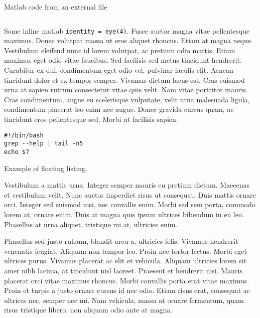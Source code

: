 \documentclass[10pt,twocolumn,letterpaper]{article}
\begin{document}
Matlab code from an external file

\inputminted[bgcolor=bg]{matlab}{code.m}

Some inline matlab \texttt{identity = eye(4)}.  Fusce auctor magna vitae pellentesque maximus. Donec volutpat massa ut eros aliquet rhoncus. Etiam at magna neque. Vestibulum eleifend nunc id lorem volutpat, ac pretium odio mattis. Etiam maximus eget odio vitae faucibus. Sed facilisis sed metus tincidunt hendrerit. Curabitur ex dui, condimentum eget odio vel, pulvinar iaculis elit. Aenean tincidunt dolor et ex tempor semper. Vivamus dictum lacus est. Cras euismod urna at sapien rutrum consectetur vitae quis velit. Nam vitae porttitor mauris. Cras condimentum, augue eu scelerisque vulputate, velit urna malesuada ligula, condimentum placerat leo enim nec augue. Donec gravida cursus quam, ac tincidunt eros pellentesque sed. Morbi ut facilisis sapien.

\begin{listing}[xleftmargin=25.0ex,tp]
 \centering
\begin{minipage}{0.8\linewidth}


\begin{verbatim}
#!/bin/bash
grep --help | tail -n5 
echo $?
\end{verbatim}
\end{minipage}
\caption{Example of floating listing.}
\label{lst:example}
\end{listing}

Vestibulum a mattis urna. Integer semper mauris eu pretium dictum. Maecenas et vestibulum velit. Nunc auctor imperdiet risus ut consequat. Duis mattis ornare orci. Integer sed euismod nisi, nec convallis enim. Morbi sed sem porta, commodo lorem at, ornare enim. Duis at magna quis ipsum ultrices bibendum in eu leo. Phasellus at urna aliquet, tristique mi at, ultricies enim.



Phasellus sed justo rutrum, blandit arcu a, ultricies felis. Vivamus hendrerit venenatis feugiat. Aliquam non tempor leo. Proin nec tortor lectus. Morbi eget ultrices purus. Vivamus placerat ac elit et vehicula. Aliquam ultricies lorem sit amet nibh lacinia, at tincidunt nisl laoreet. Praesent et hendrerit nisi. Mauris placerat orci vitae maximus rhoncus. Morbi convallis porta erat vitae maximus. Proin et turpis a justo ornare cursus id nec odio. Etiam risus erat, consequat ac ultrices nec, semper nec mi. Nam vehicula, massa at ornare fermentum, quam risus tristique libero, non aliquam odio ante at magna.
\end{document}
